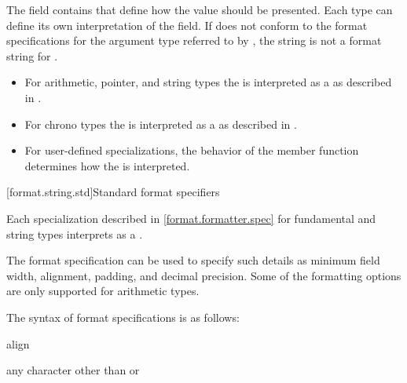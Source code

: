 \pnum
The  field contains
that define how the value should be presented.
Each type can define its own
interpretation of the  field.
If  does not conform
to the format specifications for
the argument type referred to by ,
the string is not a format string for .
\begin{example}
\begin{itemize}
\item
For arithmetic, pointer, and string types
the 
is interpreted as a 
as described in .
\item
For chrono types
the 
is interpreted as a 
as described in .
\item
For user-defined  specializations,
the behavior of the  member function
determines how the 
is interpreted.
\end{itemize}
\end{example}

[format.string.std]{Standard format specifiers}

\pnum
Each  specialization
described in \ref{format.formatter.spec}
for fundamental and string types
interprets  as a
.
\begin{note}
The format specification can be used to specify such details as
minimum field width, alignment, padding, and decimal precision.
Some of the formatting options
are only supported for arithmetic types.
\end{note}
The syntax of format specifications is as follows:

\begin{ncbnf}
\br
      \opt{\terminal{\#}}     
\end{ncbnf}

\begin{ncbnf}
\br
     align
\end{ncbnf}

\begin{ncbnf}
\br
    \textnormal{any character other than \tcode{\{} or \tcode{\}}}
\end{ncbnf}


